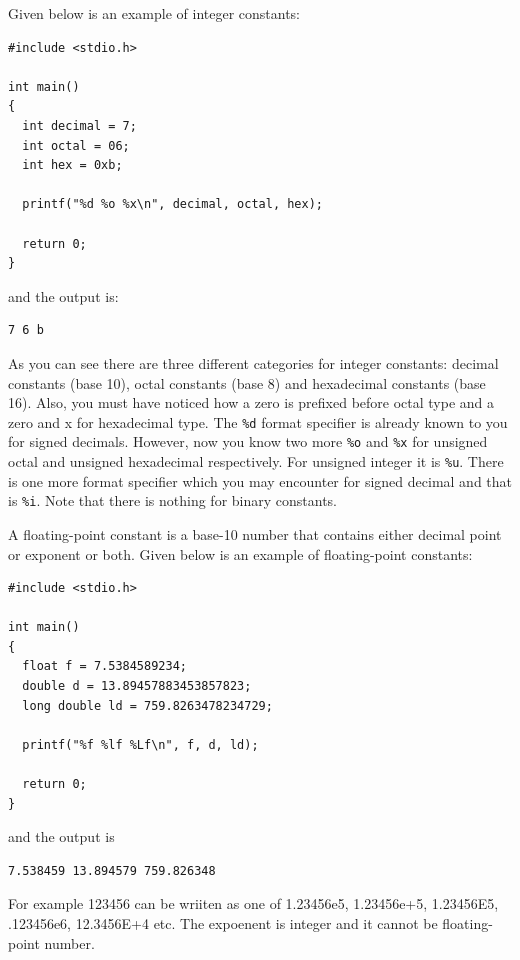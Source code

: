 Given below is an example of integer constants:

\begin{Verbatim}[frame=single]
#include <stdio.h>

int main()
{
  int decimal = 7;
  int octal = 06;
  int hex = 0xb;

  printf("%d %o %x\n", decimal, octal, hex);

  return 0;
}
\end{Verbatim}

and the output is:

\begin{Verbatim}[frame=single]
7 6 b
\end{Verbatim}

As you can see there are three different categories for integer constants:
decimal constants (base 10), octal constants (base 8) and hexadecimal constants
(base 16). Also, you must have noticed how a zero is prefixed before octal type
and a zero and x for hexadecimal type. The \texttt{\%d} format specifier is
already known to you for signed decimals. However, now you know two more
\texttt{\%o} and \texttt{\%x} for unsigned octal and unsigned hexadecimal
respectively. For unsigned integer it is \texttt{\%u}. There is one more format
specifier which you may encounter for signed decimal and that is
\texttt{\%i}. Note that there is nothing for binary constants.

A floating-point constant is a base-10 number that contains either decimal
point or exponent or both. Given below is an example of floating-point
constants:

\begin{Verbatim}[frame=single]
#include <stdio.h>

int main()
{
  float f = 7.5384589234;
  double d = 13.89457883453857823;
  long double ld = 759.8263478234729;

  printf("%f %lf %Lf\n", f, d, ld);

  return 0;
}
\end{Verbatim}

and the output is

\begin{Verbatim}[frame=single]
7.538459 13.894579 759.826348
\end{Verbatim}

For example 123456 can be wriiten as one of 1.23456e5, 1.23456e+5, 1.23456E5,
.123456e6, 12.3456E+4 etc. The expoenent is integer and it cannot be
floating-point number.

